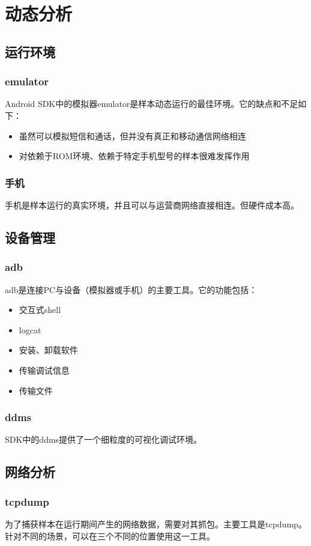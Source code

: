 \chapter{动态分析}

\section{运行环境}
\subsection{emulator}
Android SDK中的模拟器emulator是样本动态运行的最佳环境。它的缺点和不足如下：
\begin{itemize}
\item 虽然可以模拟短信和通话，但并没有真正和移动通信网络相连
\item 对依赖于ROM环境、依赖于特定手机型号的样本很难发挥作用
\end{itemize}
\subsection{手机}
手机是样本运行的真实环境，并且可以与运营商网络直接相连。但硬件成本高。
\section{设备管理}
\subsection{adb}
adb是连接PC与设备（模拟器或手机）的主要工具。它的功能包括：
\begin{itemize}
\item 交互式shell
\item logcat
\item 安装、卸载软件
\item 传输调试信息
\item 传输文件
\end{itemize}
\subsection{ddms}
SDK中的ddms提供了一个细粒度的可视化调试环境。
\section{网络分析}
\subsection{tcpdump}
为了捕获样本在运行期间产生的网络数据，需要对其抓包。主要工具是tcpdump。针对不同的场景，可以在三个不同的位置使用这一工具。
